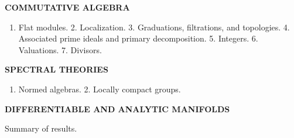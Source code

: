 \documentclass[12pt,a4paper,oneside]{book}
\providecommand{\tightlist}{\setlength{\itemsep}{0pt}\setlength{\parskip}{0pt}}
\begin{document}
\textbf{COMMUTATIVE ALGEBRA}

\begin{enumerate}
\def\labelenumi{\arabic{enumi}.}
\tightlist
\item
  Flat modules. 2. Localization. 3. Graduations, filtrations, and topologies. 4. Associated prime ideals and primary decomposition. 5. Integers. 6. Valuations. 7. Divisors.
\end{enumerate}

\textbf{SPECTRAL THEORIES}

\begin{enumerate}
\def\labelenumi{\arabic{enumi}.}
\tightlist
\item
  Normed algebras. 2. Locally compact groups.
\end{enumerate}

\textbf{DIFFERENTIABLE AND ANALYTIC MANIFOLDS}

Summary of results.

\mainmatter
\end{document}
